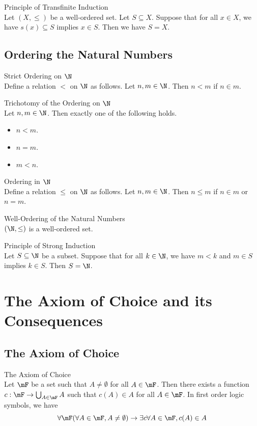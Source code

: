 \documentclass[a4paper]{article}
\begin{document}
\begin{thm}{Principle of Transfinite Induction}{}\\
Let $(X,\leq)$ be a well-ordered set. Let $S\subseteq X$. Suppose that for all $x\in X$, we have $s(x)\subseteq S$ implies $x\in S$. Then we have $S=X$. 
\end{thm}

\subsection{Ordering the Natural Numbers}
\begin{defn}{Strict Ordering on $\N$}{}\\
Define a relation $<$ on $\N$ as follows. Let $n,m\in\N$. Then $n<m$ if $n\in m$. 
\end{defn}

\begin{thm}{Trichotomy of the Ordering on $\N$}{}\\
Let $n,m\in\N$. Then exactly one of the following holds. 
\begin{itemize}
\item $n<m$. 
\item $n=m$. 
\item $m<n$. 
\end{itemize}
\end{thm}

\begin{defn}{Ordering in $\N$}{}\\
Define a relation $\leq$ on $\N$ as follows. Let $n,m\in\N$. Then $n\leq m$ if $n\in m$ or $n=m$. 
\end{defn}

\begin{thm}{Well-Ordering of the Natural Numbers}{}\\
$(\N,\leq)$ is a well-ordered set. 
\end{thm}

\begin{crl}{Principle of Strong Induction}{}\\
Let $S\subseteq\N$ be a subset. Suppose that for all $k\in\N$, we have $m<k$ and $m\in S$ implies $k\in S$. Then $S=\N$. 
\end{crl}

\pagebreak
\section{The Axiom of Choice and its Consequences}
\subsection{The Axiom of Choice}
\begin{axm}{The Axiom of Choice}{}\\
Let $\mF$ be a set such that $A\neq\emptyset$ for all $A\in\mF$. Then there exists a function $c:\mF\to\bigcup_{A\in\mF}A$ such that $c(A)\in A$ for all $A\in\mF$. In first order logic symbols, we have $$\forall\mF(\forall A\in\mF,A\neq\emptyset)\to\exists c\forall A\in\mF,c(A)\in A$$
\end{axm}
\end{document}
